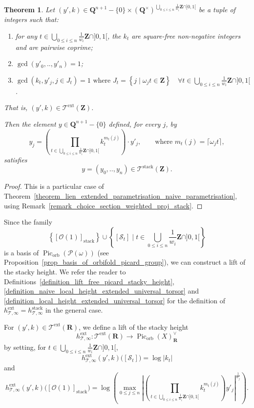 \documentclass{proc-l}
\newcommand{\R}{\mathbf{R}}
\newcommand{\Z}{\mathbf{Z}}
\newcommand{\Q}{\mathbf{Q}}
\DeclareMathOperator{\Pic}{Pic}
\DeclareMathOperator{\stack}{stack}
\DeclareMathOperator{\orb}{orb}
\DeclareMathOperator{\ext}{ext}
\newcommand{\stackS}{\mathcal{S}}
\newcommand{\stackT}{\mathcal{T}}
\newcommand{\stackP}{\mathcal{P}}
\newcommand{\sheafO}{\mathcal{O}}
\newcommand{\w}{\omega}
\newtheorem{theorem}{Theorem}[section]
\theoremstyle{definition}
\theoremstyle{remark}
\numberwithin{equation}{section}
\begin{document}
\begin{theorem}\label{theorem_first_example_orbifold_universal_torsor}
 Let $(y',k) \in \Q^{n + 1}-\{0\} \times \left( \Q^{\times} \right)^{\bigcup\limits_{0 \leqslant i \leqslant n} \frac{1}{w_i} \Z \cap ]0,1[}$ be a tuple of integers such that:
\begin{enumerate}
    \item for any $t \in \bigcup\limits_{0 \leqslant i \leqslant n} \frac{1}{w_i} \Z \cap ]0,1[$, the $k_t$ are square-free non-negative integers and are pairwise coprime;
    \item $\gcd(y'_0,..,y'_n) = 1$;
    \item $\gcd\left( k_t, y'_j, j \in J_t \right) = 1 \text{ where } J_t = \left\{ j \mid \w_j t \in \Z \right\} \quad \forall t \in \bigcup\limits_{0 \leqslant i \leqslant n} \frac{1}{w_i} \Z \cap ]0,1[$.
\end{enumerate}
That is, $(y',k) \in \stackT^{\ext}(\Z)$.

Then the element $y \in \Q^{n + 1}-\{0\}$ defined, for every $j$, by
$$
y_j = \left(\prod\limits_{t \in \bigcup\limits_{0 \leqslant i \leqslant n} \frac{1}{w_i} \Z \cap ]0,1[} k_t^{m_t(j)} \right) \cdot y'_j,
\qquad \text{where } m_t(j) = \lceil \w_j t \rceil,
$$
satisfies
$$
y = (y_0,..,y_n) \in \stackT^{\stack}(\Z).
$$
    
\end{theorem}

\begin{proof}
This is a particular case of Theorem~\ref{theorem_lien_extended_parametrisation_naive_parametrisation}, using Remark~\ref{remark_choice_section_weighted_proj_stack}.
\end{proof}

Since the family
$$
\left\{ [\sheafO(1)]_{\stack} \right\}
\cup
\left\{ [\stackS_t] \mid t \in \bigcup\limits_{0 \leqslant i \leqslant n} \frac{1}{w_i}\Z \cap ]0,1[ \right\}
$$
is a basis of $\Pic_{\orb}(\stackP(\w))$ (see Proposition~\ref{prop_basis_of_orbifold_picard_group}), we can construct a lift of the stacky height. We refer the reader to Definitions~\ref{definition_lift_free_picard_stacky_height}, \ref{definition_naive_local_height_extended_universal_torsor} and \ref{definition_local_height_extended_universal_torsor} for the definition of $h_{\stackT,\infty}^{\ext} = h_{\stackT,\infty}^{\stack}$ in the general case.

For $(y',k) \in \stackT^{\ext}(\R)$, we define a lift of the stacky height
$$
h_{\stackT,\infty}^{\ext} : \stackT^{\ext}(\R) \longrightarrow \Pic_{\orb}(X)^{\vee}_{\R}
$$
by setting, for $t \in \bigcup\limits_{0 \leqslant i \leqslant n} \frac{1}{w_i}\Z \cap ]0,1[$,
$$
h_{\stackT,\infty}^{\ext}(y',k)\bigl([\stackS_t]\bigr)
=
\log \left| k_t \right|
$$
and
$$
h_{\stackT,\infty}^{\ext}(y',k)\bigl([\sheafO(1)]_{\stack}\bigr)
=
\log \left(
\max\limits_{0 \leqslant j \leqslant n}
\left|
\left(
\prod\limits_{t \in \bigcup\limits_{0 \leqslant i \leqslant n} \frac{1}{w_i}\Z \cap ]0,1[}
k_t^{m_t(j)}
\right)
y'_j
\right|^{\frac{1}{w_j}}
\right).
$$
\end{document}
